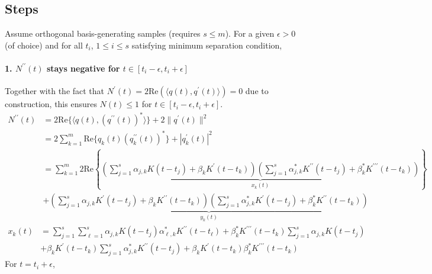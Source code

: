 \documentclass[11pt]{article}
\newcommand{\ra}{\rangle}
\newcommand{\la}{\langle}
\renewcommand{\Re}{\mathrm{Re}}
\newcounter{para}
\begin{document}
\subsection{Steps}
Assume orthogonal basis-generating samples (requires $ s\leq m $). For a given $ \epsilon>0 $ (of choice) and for all $ t_i $, $ 1\leq i \leq s $ satisfying minimum separation condition,
\paragraph{1. $ N^{\prime\prime}(t) $ stays negative for $ t \in [t_i-\epsilon, t_{i}+\epsilon] $} 
Together with the fact that $ N^\prime(t) = 2\Re(\la q(t), q^\prime(t) \ra) = 0  $ due to construction, this ensures $ N(t)\leq 1 $ for $ t \in [t_i-\epsilon, t_{i}+\epsilon] $. 
\begin{align}
	N^{\prime\prime}(t) &= 2\Re\{\la q(t), (q^{\prime\prime}(t))^* \ra\} + 2\|q^\prime(t)\|^2 \\
	& = 2\sum_{k = 1}^m \Re \{q_k(t) (q^{\prime\prime}_k(t))^*\} + |q_k^\prime(t)|^2 \\
	& = \sum_{k = 1}^m 2\Re\left\{\underbrace{\left(\sum_{j = 1}^s \alpha_{j, k} K(t - t_j) + \beta_kK^\prime(t - t_k)\right) \left(\sum_{j = 1}^s \alpha_{j, k}^* K^{\prime\prime}(t - t_j) + \beta_k^* K^{\prime\prime\prime}(t - t_k) \right)}_{x_k(t)}\right\} \\
	&+ \underbrace{\left(\sum_{j = 1}^s \alpha_{j, k} K^{\prime}(t - t_j) + \beta_kK^{\prime\prime}(t - t_k)\right) \left(\sum_{j = 1}^s \alpha_{j, k}^* K^{\prime}(t - t_j) + \beta_k^* K^{\prime\prime}(t - t_k) \right)}_{y_k(t)} 
\end{align}
\begin{align}
	x_k(t)& = \sum_{j = 1}^s\sum_{\ell = 1}^s \alpha_{j, k} K(t - t_j) \alpha_{\ell, k}^* K^{\prime\prime}(t - t_\ell) + \beta_k^* K^{\prime\prime\prime}(t - t_k) \sum_{j = 1}^s \alpha_{j, k} K(t - t_j) \\
	& +\beta_kK^\prime(t - t_k) \sum_{j = 1}^s \alpha_{j, k}^* K^{\prime\prime}(t - t_j) + \beta_kK^\prime(t - t_k) \beta_k^* K^{\prime\prime\prime}(t - t_k)  
\end{align}
For $ t = t_i+\epsilon $,
\end{document}
